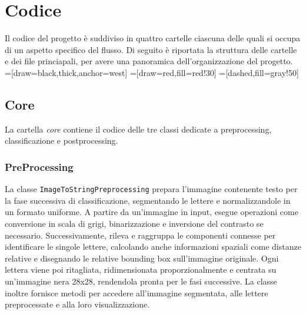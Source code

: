 \chapter{Codice}

Il codice del progetto è suddiviso in quattro cartelle ciascuna delle quali si occupa di un aspetto specifico del flusso. Di seguito è riportata la struttura delle cartelle e dei file princiapali, per avere una panoramica dell'organizzazione del progetto. \\ 

=[draw=black,thick,anchor=west]
=[draw=red,fill=red!30]
=[dashed,fill=gray!50]

\section{Core}
La cartella \emph{core} contiene il codice delle tre classi dedicate a preprocessing, classificazione e postprocessing.

\subsection{PreProcessing}
La classe \texttt{ImageToStringPreprocessing} prepara l'immagine contenente testo per la fase successiva di classificazione, segmentando le lettere e normalizzandole in un formato uniforme. A partire da un'immagine in input, esegue operazioni come conversione in scala di grigi, binarizzazione e inversione del contrasto se necessario. 
Successivamente, rileva e raggruppa le componenti connesse per identificare le singole lettere, calcolando anche informazioni spaziali come distanze relative e disegnando le relative bounding box sull'immagine originale.
Ogni lettera viene poi ritagliata, ridimensionata proporzionalmente e centrata su un'immagine nera 28x28, rendendola pronta per le fasi successive. La classe inoltre fornisce metodi per accedere all'immagine segmentata, alle lettere preprocessate e alla loro visualizzazione.

